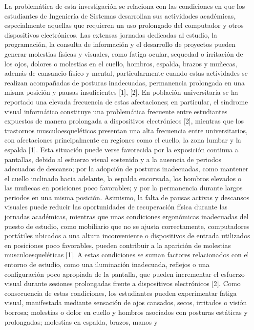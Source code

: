 La problemática de esta investigación se relaciona con las condiciones en que los
estudiantes de Ingeniería de Sistemas desarrollan sus actividades académicas,
especialmente aquellas que requieren un uso prolongado del computador y otros
dispositivos electrónicos. Las extensas jornadas dedicadas al estudio, la
programación, la consulta de información y el desarrollo de proyectos pueden generar
molestias físicas y visuales, como fatiga ocular, sequedad o irritación de los ojos,
dolores o molestias en el cuello, hombros, espalda, brazos y muñecas, además de
cansancio físico y mental, particularmente cuando estas actividades se realizan
acompañadas de posturas inadecuadas, permanencia prolongada en una misma posición y
pausas insuficientes [1], [2]. En población universitaria se ha reportado una elevada
frecuencia de estas afectaciones; en particular, el síndrome visual informático
constituye una problemática frecuente entre estudiantes expuestos de manera
prolongada a dispositivos electrónicos [2], mientras que los trastornos
musculoesqueléticos presentan una alta frecuencia entre universitarios, con
afectaciones principalmente en regiones como el cuello, la zona lumbar y la espalda
[1]. Esta situación puede verse favorecida por la exposición continua a pantallas,
debido al esfuerzo visual sostenido y a la ausencia de periodos adecuados de
descanso; por la adopción de posturas inadecuadas, como mantener el cuello inclinado
hacia adelante, la espalda encorvada, los hombros elevados o las muñecas en
posiciones poco favorables; y por la permanencia durante largos periodos en una
misma posición. Asimismo, la falta de pausas activas y descansos visuales puede
reducir las oportunidades de recuperación física durante las jornadas académicas,
mientras que unas condiciones ergonómicas inadecuadas del puesto de estudio, como
mobiliario que no se ajusta correctamente, computadores portátiles ubicados a una
altura inconveniente o dispositivos de entrada utilizados en posiciones poco
favorables, pueden contribuir a la aparición de molestias musculoesqueléticas [1]. A
estas condiciones se suman factores relacionados con el entorno de estudio, como una
iluminación inadecuada, reflejos o una configuración poco apropiada de la pantalla,
que pueden incrementar el esfuerzo visual durante sesiones prolongadas frente a
dispositivos electrónicos [2]. Como consecuencia de estas condiciones, los
estudiantes pueden experimentar fatiga visual, manifestada mediante sensación de ojos
cansados, secos, irritados o visión borrosa; molestias o dolor en cuello y hombros
asociados con posturas estáticas y prolongadas; molestias en espalda, brazos, manos y
